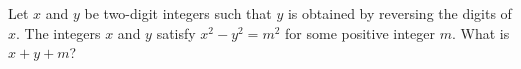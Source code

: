 Let \(x\) and \(y\) be two-digit integers such that \(y\) is obtained by reversing the digits of \(x\). The integers \(x\) and \(y\) satisfy \(x^2-y^2=m^2\) for some positive integer \(m\). What is \(x+y+m\)?
